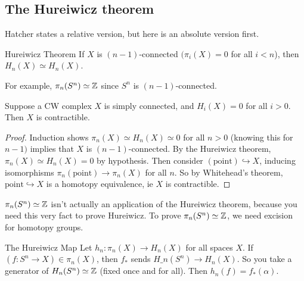 \subsection{The Hureiwicz theorem}
Hatcher states a relative version, but here is an absolute version first.
\begin{namedthm}{Hureiwicz Theorem}
    If $X$ is $(n-1)$-connected $(\pi_i  (X)=0$ for all $i<n$), then $H_n (X) \simeq H_n (X)$. 
\end{namedthm}
For example, $\pi_n (S^n )\simeq\mathbb{Z}$ since $S^n $ is $(n-1)$-connected.
\begin{cor}
    Suppose a CW complex $X$ is simply connected, and $H_i (X)=0$ for all $i>0$. Then $X$ is contractible.
\end{cor}
\begin{proof}
    Induction shows $\pi_n (X)\simeq H_n (X) \simeq 0$ for all $n>0$ (knowing this for $n-1)$ implies that $X$ is $(n-1)$-connected. By the Hureiwicz theorem, $\pi_n (X)\simeq H_n (X)=0$ by hypothesis. Then consider $(\text{point}  )\hookrightarrow X$, inducing isomorphisms $\pi_n (\text{point} )\to \pi_n (X) $ for all $n$. So by Whitehead's theorem, $\text{point} \hookrightarrow X$ is a homotopy equivalence, ie $X$ is contractible.
\end{proof}
\begin{note}
    $\pi_n (S^n )\simeq\mathbb{Z}$ isn't actually an application of the Hureiwicz theorem, because you need this very fact to prove Hureiwicz. To prove  $\pi_n (S^n )\simeq\mathbb{Z}$, we need excision for homotopy groups.
\end{note}
\begin{namedthing}{The Hureiwicz Map}
    Let $h_n  \colon \pi_n (X) \to H_n (X)$ for all spaces $X$. If $\left( f \colon S^n  \to X \right) \in  \pi_n (X)$, then $f_*$ sends $H\_n (S^n )\to H_n (X)$. So you take a generator of $H_n (S^n )\simeq \mathbb{Z}$ (fixed once and for all). Then $h_n (f)=f_*(\alpha )$. 
\end{namedthing}
